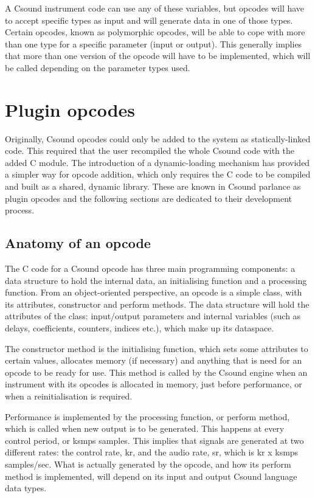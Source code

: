\documentclass[11pt]{article}
\begin{document}
A Csound instrument code can use any of these variables, but opcodes will have to accept specific types as input and will generate data in one of those types. Certain opcodes, known as polymorphic opcodes, will be able to cope with more than one type for a specific parameter (input or output). This generally implies that more than one version of the opcode will have to be implemented, which will be called depending on the parameter types used.

\section{ Plugin opcodes}

Originally, Csound opcodes could only be added to the system as statically-linked code. This required that the user recompiled the whole Csound code with the added C module. The introduction of a dynamic-loading mechanism has provided a simpler way for opcode addition, which only requires the C code to be compiled and built as a shared, dynamic library. These are known in Csound parlance as plugin opcodes and the following sections are dedicated to their development process.

\subsection{ Anatomy of an opcode}
The C code for a Csound opcode has three main programming components: a data structure to hold the internal data, an initialising function and a processing function. From an object-oriented perspective, an opcode is a simple class, with its attributes, constructor and perform methods. The data structure will hold the attributes of the class: input/output parameters and internal variables (such as delays, coefficients, counters, indices etc.), which make up its dataspace. 

The constructor method is the initialising function, which sets some attributes to certain values, allocates memory (if necessary) and anything that is need for an opcode to be ready for use. This method is called by the Csound engine when an instrument with its opcodes is allocated in memory, just before performance, or when a reinitialisation is required.

Performance is implemented by the processing function, or perform method, which is called when new output is to be generated. This happens at every control period, or ksmps samples. This implies that signals are generated at two different rates: the control rate, kr, and the audio rate, sr, which is kr x ksmps samples/sec. What is actually generated by the opcode, and how its perform method is implemented, will depend on its input and output Csound language data types.
\end{document}
